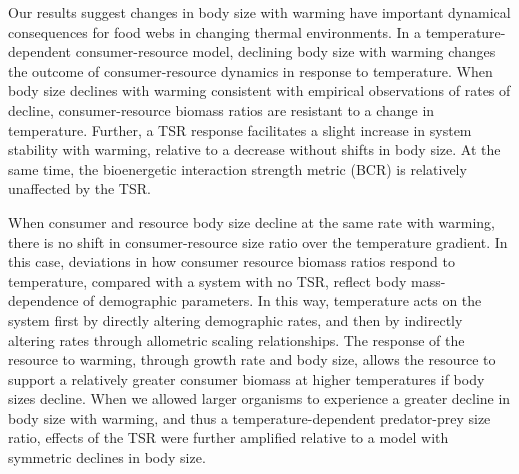 \documentclass[11pt]{article}
\begin{document}
Our results suggest changes in body size with warming have important dynamical consequences for food webs in changing thermal environments. In a temperature-dependent consumer-resource model, declining body size with warming changes the outcome of consumer-resource dynamics in response to temperature. When body size declines with warming consistent with empirical observations of rates of decline, consumer-resource biomass ratios are resistant to a change in temperature. Further, a TSR response facilitates a slight increase in system stability with warming, relative to a decrease without shifts in body size. At the same time, the bioenergetic interaction strength metric (BCR) is relatively unaffected by the TSR. 

When consumer and resource body size decline at the same rate with warming, there is no shift in consumer-resource size ratio over the temperature gradient. In this case, deviations in how consumer resource biomass ratios respond to temperature, compared with a system with no TSR, reflect body mass-dependence of demographic parameters. In this way, temperature acts on the system first by directly altering demographic rates, and then by indirectly altering rates through allometric scaling relationships. The response of the resource to warming, through growth rate and body size, allows the resource to support a relatively greater consumer biomass at higher temperatures if body sizes decline. When we allowed larger organisms to experience a greater decline in body size with warming, and thus a temperature-dependent predator-prey size ratio, effects of the TSR were further amplified relative to a model with symmetric declines in body size. 
\end{document}
